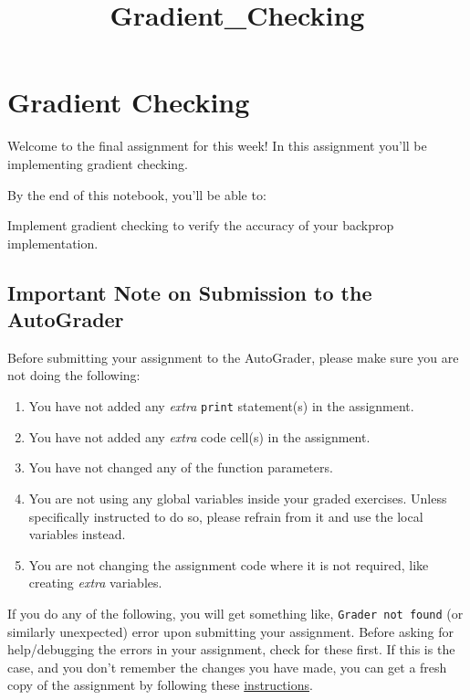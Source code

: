 \documentclass[11pt]{article}
\title{Gradient\_Checking}
\providecommand{\tightlist}{%
      \setlength{\itemsep}{0pt}\setlength{\parskip}{0pt}}
\begin{document}
    
    \maketitle
    
    

    
    \hypertarget{gradient-checking}{%
\section{Gradient Checking}\label{gradient-checking}}

Welcome to the final assignment for this week! In this assignment you'll
be implementing gradient checking.

By the end of this notebook, you'll be able to:

Implement gradient checking to verify the accuracy of your backprop
implementation.

\hypertarget{important-note-on-submission-to-the-autograder}{%
\subsection{Important Note on Submission to the
AutoGrader}\label{important-note-on-submission-to-the-autograder}}

Before submitting your assignment to the AutoGrader, please make sure
you are not doing the following:

\begin{enumerate}
\def\labelenumi{\arabic{enumi}.}
\tightlist
\item
  You have not added any \emph{extra} \texttt{print} statement(s) in the
  assignment.
\item
  You have not added any \emph{extra} code cell(s) in the assignment.
\item
  You have not changed any of the function parameters.
\item
  You are not using any global variables inside your graded exercises.
  Unless specifically instructed to do so, please refrain from it and
  use the local variables instead.
\item
  You are not changing the assignment code where it is not required,
  like creating \emph{extra} variables.
\end{enumerate}

If you do any of the following, you will get something like,
\texttt{Grader\ not\ found} (or similarly unexpected) error upon
submitting your assignment. Before asking for help/debugging the errors
in your assignment, check for these first. If this is the case, and you
don't remember the changes you have made, you can get a fresh copy of
the assignment by following these
\href{https://www.coursera.org/learn/deep-neural-network/supplement/QWEnZ/h-ow-to-refresh-your-workspace}{instructions}.
\end{document}
